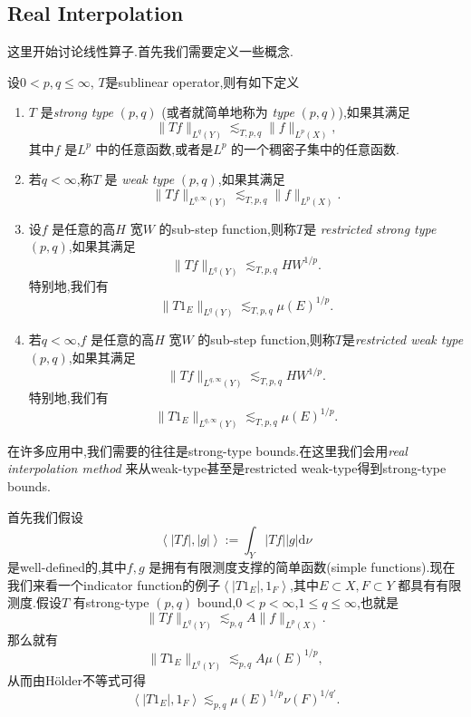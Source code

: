\subsection{Real Interpolation}
这里开始讨论线性算子.首先我们需要定义一些概念.
\begin{definition}
  设$0<p,q\le \infty$, $T$是sublinear operator,则有如下定义
   \begin{enumerate}
     \item $T$ 是\textit{strong type} $(p,q)$ (或者就简单地称为 \textit{type} $(p,q)$),如果其满足
       \[
	 \|Tf\|_{L^{q}(Y)}\lesssim_{T,p,q}\|f\|_{L^{p}(X)},
       \] 
       其中$f$ 是$L^{p}$ 中的任意函数,或者是$L^{p}$ 的一个稠密子集中的任意函数.
     \item 若$q<\infty$,称$T$ 是 \textit{weak type} $(p,q)$,如果其满足
       \begin{equation}
	 \|Tf\|_{L^{q,\infty}(Y)}\lesssim_{T,p,q}\|f\|_{L^{p}(X)}.
       \end{equation}
     \item 设$f$ 是任意的高$H$ 宽$W$ 的sub-step function,则称$T$是 \textit{restricted strong type}  $(p,q)$,如果其满足
       \begin{equation}
	 \|Tf\|_{L^{q}(Y)}\lesssim_{T,p,q} HW^{1 /p}.
       \end{equation}
       特别地,我们有
       \begin{equation}
	 \|T 1_{E}\|_{L^{q}(Y)}\lesssim_{T,p,q} \mu(E)^{1 /p}.
       \end{equation}
     \item 若$q<\infty$,$f$ 是任意的高$H$ 宽$W$ 的sub-step function,则称$T$是\textit{restricted weak type } $(p,q)$,如果其满足
       \begin{equation}
	 \|Tf\|_{L^{q,\infty}(Y)}\lesssim_{T,p,q}HW^{1 /p}.
       \end{equation}
       特别地,我们有
       \begin{equation}
	 \|T 1_E\|_{L^{q,\infty}(Y)}\lesssim_{T,p,q}\mu(E)^{1 /p}.
       \end{equation}
  \end{enumerate}
\end{definition}

在许多应用中,我们需要的往往是strong-type bounds.在这里我们会用\textit{real interpolation method} 来从weak-type甚至是restricted weak-type得到strong-type bounds.

首先我们假设
\begin{equation}\label{1-3}
  \left<|Tf|,|g| \right>:=\int_{Y}|Tf| |g|\mathrm{d}\nu
\end{equation}
是well-defined的,其中$f,g$ 是拥有有限测度支撑的简单函数(simple functions).现在我们来看一个indicator function的例子$\left<|T 1_E|,1_F \right>$,其中$E\subset X,F\subset Y$ 都具有有限测度.假设$T$ 有strong-type $(p,q)$ bound,$0<p<\infty$,$1\le q\le \infty$,也就是
\[
  \|Tf\|_{L^{q}(Y)}\lesssim_{p,q}A\|f\|_{L^{p}(X)}.
\] 
那么就有
\[
  \|T 1_E\|_{L^{q}(Y)}\lesssim_{p,q}A\mu(E)^{1 /p},
\] 
从而由H\"{o}lder不等式可得
\begin{equation}
  \left<|T 1_E|, 1_F \right>\lesssim_{p,q}\mu(E)^{1 /p}\nu(F)^{1 /q'}.
\end{equation}

